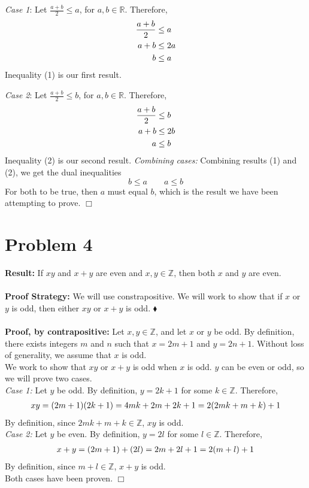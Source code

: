 \documentclass[11pt]{article}
\begin{document}
    \textit{Case 1}: Let $\frac{a+b}{2} \leq a$, for $a, b \in \mathbb{R}$. Therefore, 
    \begin{align}
        \frac{a+b}{2} & \le a \notag \\
        a+b & \le 2a \notag \\
        b & \le a \label{ineq1}
    \end{align}
    Inequality (1) is our first result.

     \textit{Case 2}: Let $\frac{a+b}{2} \leq b$, for $a, b \in \mathbb{R}$. Therefore, 
    \begin{align}
        \frac{a+b}{2} & \le b \notag \\
        a+b & \le 2b \notag \\
        a & \le b \label{ineq2}
    \end{align}
    Inequality (2) is our second result.
    \textit{Combining cases:} Combining results (1) and (2), we get the dual inequalities 
    $$
        b \leq a \qquad a \leq b
    $$
    For both to be true, then $a$ must equal $b$, which is the result we have been attempting to prove. \hfill $\Box$

\newpage


\section*{Problem 4}

    \textbf{Result:} If $xy$ and $x+y$ are even and $x, y \in \mathbb{Z}$, then both $x$ and $y$ are even.\\
    \\
    \textbf{Proof Strategy:} We will use constrapositive. We will work to show that if $x$ or $y$ is odd, then either $xy$ or $x+y$ is odd. \hfill $\blacklozenge$\\
    \\
    \textbf{Proof, by contrapositive:} Let $x, y \in \mathbb{Z}$, and let $x$ or $y$ be odd. By definition, there exists integers $m$ and $n$ such that $x=2m+1$ and $y=2n+1$. Without loss of generality, we assume that $x$ is odd.\\
    We work to show that $xy$ or $x+y$ is odd when $x$ is odd. $y$ can be even or odd, so we will prove two cases.\\
    \textit{Case 1:} Let $y$ be odd. By definition, $y = 2k+1$ for some $k \in \mathbb{Z}$. Therefore, 
    \begin{align}
        xy = (2m+1)(2k+1) = 4mk+2m+2k+1 = 2(2mk+m+k)+1 \notag
    \end{align}
    By definition, since $2mk+m+k \in \mathbb{Z}$, $xy$ is odd. \\
    \textit{Case 2:} Let $y$ be even. By definition, $y = 2l$ for some $l \in \mathbb{Z}$. Therefore, 
    \begin{align}
        x+y = (2m+1)+(2l) = 2m+2l+1= 2(m+l)+1 \notag
    \end{align}
    By definition, since $m+l \in \mathbb{Z}$, $x+y$ is odd.\\
    Both cases have been proven. \hfill $\Box$
\end{document}

